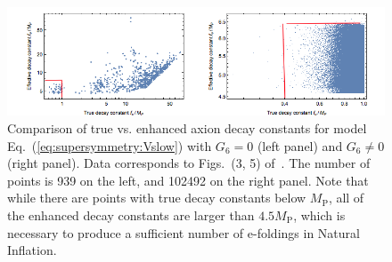 \documentclass[12pt]{article}
\begin{document}
\begin{figure} \label{fig:supersymmetry} %
  \centering
  \includegraphics[width = 0.8 \textwidth]{figs/figsusy.png}
  \caption{Comparison of true vs. enhanced axion decay constants for model Eq.~(\ref{eq:supersymmetry:Vslow}) with $G_6 = 0$ (left panel) and $G_6 \neq 0$ (right panel).
    Data corresponds to Figs.~(3, 5) of~\cite{Nath:2017ihp}.
    The number of points is 939 on the left, and 102492 on the right panel.
    Note that while there are points with true decay constants below $M_\text{P}$, all of the enhanced decay constants are larger than $4.5 M_\text{P}$, which is necessary to produce a sufficient number of e-foldings in Natural Inflation.}
\end{figure}

\end{document}
